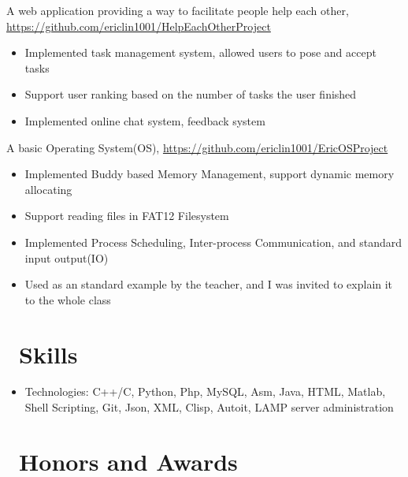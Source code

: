 \documentclass{resume}
\begin{document}
A web application providing a way to facilitate people help each other, \url{https://github.com/ericlin1001/HelpEachOtherProject}
\begin{itemize}
	\item Implemented task management system, allowed users to pose and accept tasks
\item Support user ranking based on the number of tasks the user finished
\item Implemented online chat system, feedback system
\end{itemize}
A basic Operating System(OS), \url{https://github.com/ericlin1001/EricOSProject}
\begin{itemize}
	\item Implemented Buddy based Memory Management, support dynamic memory allocating
	\item Support reading files in FAT12 Filesystem 
	\item Implemented Process Scheduling, Inter-process Communication, and standard input output(IO)
	\item Used as an standard example by the teacher, and I was invited to explain it to the whole class
\end{itemize}



\section{\faCogs\ Skills}
\begin{itemize}[parsep=0.5ex]
	\item Technologies: C++/C, Python, Php, MySQL, Asm, Java, HTML, Matlab, Shell Scripting, Git, Json, XML, Clisp, Autoit, LAMP server administration
\end{itemize}

\section{\faHeartO\ Honors and Awards}
\end{document}
